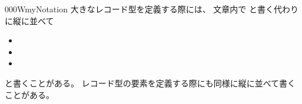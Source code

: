 \documentclass[index]{subfiles}
\begin{document}
\begin{myBlock}{000W}{myNotation}
  大きなレコード型を定義する際には、
  文章内で
  と書く代わりに縦に並べて
  \begin{itemize}
    \item {}
    \item \myInlineMath{\myVDots}
    \item {}
  \end{itemize}
  と書くことがある。
  レコード型の要素を定義する際にも同様に縦に並べて書くことがある。
\end{myBlock}
\end{document}
